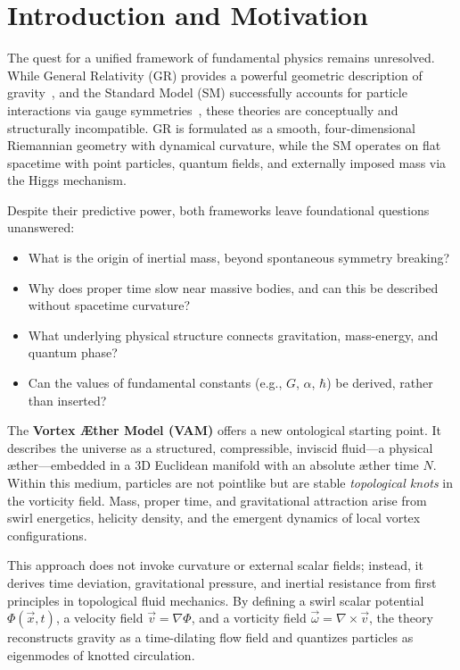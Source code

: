 \documentclass[preprint]{revtex4-2}
\begin{document}
\newpage
\begingroup
\setlength{\baselineskip}{0.9\baselineskip}  %
\tableofcontents
\endgroup
\vspace{1em}
\newpage
\section{Introduction and Motivation}\label{sec:introduction-and-motivation}
    The quest for a unified framework of fundamental physics remains unresolved. While General Relativity (GR) provides a powerful geometric description of gravity~\cite{einstein1915gr}, and the Standard Model (SM) successfully accounts for particle interactions via gauge symmetries~\cite{weinberg1995quantum}, these theories are conceptually and structurally incompatible. GR is formulated as a smooth, four-dimensional Riemannian geometry with dynamical curvature, while the SM operates on flat spacetime with point particles, quantum fields, and externally imposed mass via the Higgs mechanism.

    Despite their predictive power, both frameworks leave foundational questions unanswered:
    \begin{itemize}
        \item What is the origin of inertial mass, beyond spontaneous symmetry breaking?
        \item Why does proper time slow near massive bodies, and can this be described without spacetime curvature?
        \item What underlying physical structure connects gravitation, mass-energy, and quantum phase?
        \item Can the values of fundamental constants (e.g., $G$, $\alpha$, $\hbar$) be derived, rather than inserted?
    \end{itemize}

    The \textbf{Vortex \AE ther Model (VAM)} offers a new ontological starting point. It describes the universe as a structured, compressible, inviscid fluid---a physical \ae ther---embedded in a 3D Euclidean manifold with an absolute æther time $N$. Within this medium, particles are not pointlike but are stable \textit{topological knots} in the vorticity field. Mass, proper time, and gravitational attraction arise from swirl energetics, helicity density, and the emergent dynamics of local vortex configurations.

    This approach does not invoke curvature or external scalar fields; instead, it derives time deviation, gravitational pressure, and inertial resistance from first principles in topological fluid mechanics. By defining a swirl scalar potential $\Phi(\vec{x},t)$, a velocity field $\vec{v} = \nabla \Phi$, and a vorticity field $\vec{\omega} = \nabla \times \vec{v}$, the theory reconstructs gravity as a time-dilating flow field and quantizes particles as eigenmodes of knotted circulation.
\end{document}
